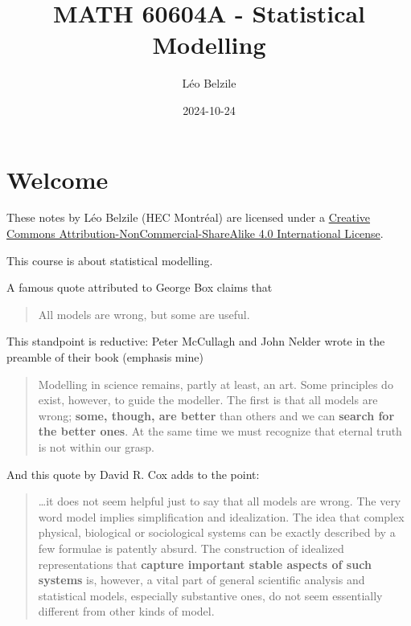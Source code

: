 \documentclass[
  11pt,
  letterpaper,
]{scrbook}
\title{MATH 60604A - Statistical Modelling}
\author{Léo Belzile}
\date{2024-10-24}
\renewcommand*\contentsname{Table of contents}
\newcommand\contentsname{Table of contents}
\theoremstyle{definition}
\theoremstyle{definition}
\theoremstyle{plain}
\theoremstyle{plain}
\theoremstyle{remark}
\begin{document}


\renewcommand*\contentsname{Table of contents}
{
\setcounter{tocdepth}{2}
\tableofcontents
}

\mainmatter
{}

\chapter*{Welcome}\label{welcome}


These notes by Léo Belzile (HEC Montréal) are licensed under a
\href{http://creativecommons.org/licenses/by-nc-sa/4.0/}{Creative
Commons Attribution-NonCommercial-ShareAlike 4.0 International License}.

This course is about statistical modelling.

A famous quote attributed to George Box claims that

\begin{quote}
All models are wrong, but some are useful.
\end{quote}

This standpoint is reductive: Peter McCullagh and John Nelder wrote in
the preamble of their book (emphasis mine)

\begin{quote}
Modelling in science remains, partly at least, an art. Some principles
do exist, however, to guide the modeller. The first is that all models
are wrong; \textbf{some, though, are better} than others and we can
\textbf{search for the better ones}. At the same time we must recognize
that eternal truth is not within our grasp.
\end{quote}

And this quote by David R. Cox adds to the point:

\begin{quote}
\ldots it does not seem helpful just to say that all models are wrong.
The very word model implies simplification and idealization. The idea
that complex physical, biological or sociological systems can be exactly
described by a few formulae is patently absurd. The construction of
idealized representations that \textbf{capture important stable aspects
of such systems} is, however, a vital part of general scientific
analysis and statistical models, especially substantive ones, do not
seem essentially different from other kinds of model.
\end{quote}
\end{document}
